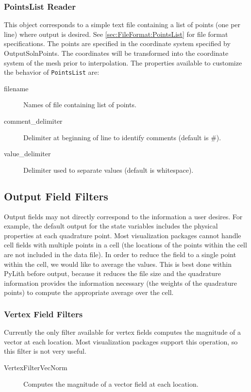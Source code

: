 \subsubsection{PointsList Reader}

This object corresponds to a simple text file containing a list of
points (one per line) where output is desired. See \ref{sec:FileFormat:PointsList}
for file format specifications. The points are specified in the coordinate
system specified by OutputSolnPoints. The coordinates will be transformed
into the coordinate system of the mesh prior to interpolation. The
properties available to customize the behavior of \texttt{PointsList}
are:
\begin{description}
\item [{filename}] Names of file containing list of points.
\item [{comment\_delimiter}] Delimiter at beginning of line to identify
comments (default is \#).
\item [{value\_delimiter}] Delimiter used to separate values (default is
whitespace).
\end{description}

\subsection{Output Field Filters}

Output fields may not directly correspond to the information a user
desires. For example, the default output for the state variables includes
the physical properties at each quadrature point. Most visualization
packages cannot handle cell fields with multiple points in a cell
(the locations of the points within the cell are not included in the
data file). In order to reduce the field to a single point within
the cell, we would like to average the values. This is best done within
PyLith before output, because it reduces the file size and the quadrature
information provides the information necessary (the weights of the
quadrature points) to compute the appropriate average over the cell.


\subsubsection{\label{sub:vertex:field:filters}Vertex Field Filters}

Currently the only filter available for vertex fields computes the
magnitude of a vector at each location. Most visualization packages
support this operation, so this filter is not very useful.
\begin{description}
\item [{VertexFilterVecNorm}] Computes the magnitude of a vector field
at each location.
\end{description}

